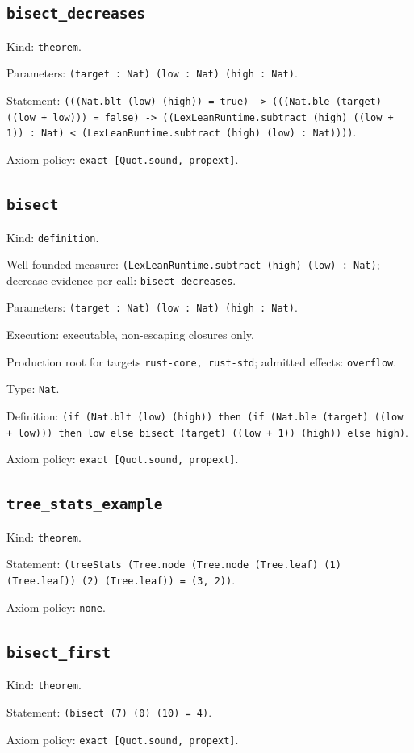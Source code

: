 \documentclass[11pt]{article}
\begin{document}
\subsection*{\texttt{bisect\_decreases}}
\noindent Kind: \texttt{theorem}.\par
\noindent Parameters: \texttt{(target : Nat) (low : Nat) (high : Nat)}.\par
\noindent Statement: \texttt{(((Nat.blt (low) (high)) = true) -> (((Nat.ble (target) ((low + low))) = false) -> ((LexLeanRuntime.subtract (high) ((low + 1)) : Nat) < (LexLeanRuntime.subtract (high) (low) : Nat))))}.\par
\noindent Axiom policy: \texttt{exact [Quot.sound, propext]}.\par
\subsection*{\texttt{bisect}}
\noindent Kind: \texttt{definition}.\par
\noindent Well-founded measure: \texttt{(LexLeanRuntime.subtract (high) (low) : Nat)}; decrease evidence per call: \texttt{bisect\_decreases}.\par
\noindent Parameters: \texttt{(target : Nat) (low : Nat) (high : Nat)}.\par
\noindent Execution: executable, non-escaping closures only.\par
\noindent Production root for targets \texttt{rust-core, rust-std}; admitted effects: \texttt{overflow}.\par
\noindent Type: \texttt{Nat}.\par
\noindent Definition: \texttt{(if (Nat.blt (low) (high)) then (if (Nat.ble (target) ((low + low))) then low else bisect (target) ((low + 1)) (high)) else high)}.\par
\noindent Axiom policy: \texttt{exact [Quot.sound, propext]}.\par
\subsection*{\texttt{tree\_stats\_example}}
\noindent Kind: \texttt{theorem}.\par
\noindent Statement: \texttt{(treeStats (Tree.node (Tree.node (Tree.leaf) (1) (Tree.leaf)) (2) (Tree.leaf)) = (3, 2))}.\par
\noindent Axiom policy: \texttt{none}.\par
\subsection*{\texttt{bisect\_first}}
\noindent Kind: \texttt{theorem}.\par
\noindent Statement: \texttt{(bisect (7) (0) (10) = 4)}.\par
\noindent Axiom policy: \texttt{exact [Quot.sound, propext]}.\par
\end{document}
